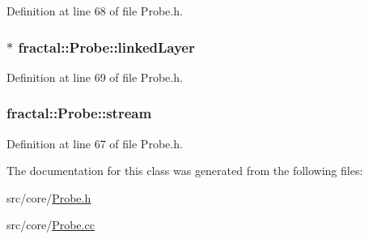 Definition at line 68 of file Probe.\+h.

\hypertarget{classfractal_1_1Probe_a121e11df32602fb8b1864845aa93c3aa}{
\subsubsection[{linked\+Layer}]{$\ast$ fractal\+::\+Probe\+::linked\+Layer\hspace{0.3cm}{\ttfamily [protected]}}}\label{classfractal_1_1Probe_a121e11df32602fb8b1864845aa93c3aa}


Definition at line 69 of file Probe.\+h.

\hypertarget{classfractal_1_1Probe_ae26569f9d3f272e044e62839fce87174}{
\subsubsection[{stream}]{ fractal\+::\+Probe\+::stream\hspace{0.3cm}{\ttfamily [protected]}}}\label{classfractal_1_1Probe_ae26569f9d3f272e044e62839fce87174}


Definition at line 67 of file Probe.\+h.



The documentation for this class was generated from the following files\+:\begin{DoxyCompactItemize}
\item 
src/core/\hyperlink{Probe_8h}{Probe.\+h}\item 
src/core/\hyperlink{Probe_8cc}{Probe.\+cc}\end{DoxyCompactItemize}
